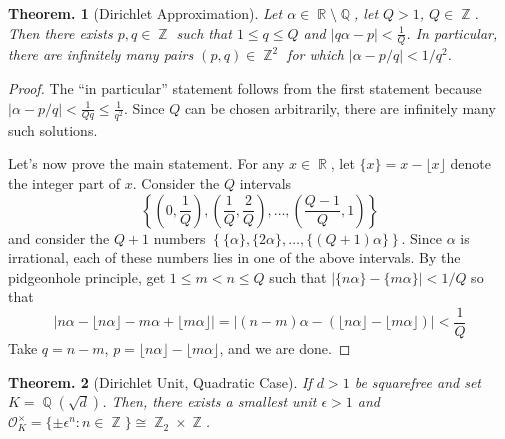 \documentclass[11pt, a4paper]{memoir}
\DeclareMathOperator{\Q}{{\mathbb{Q}}}
\DeclareMathOperator{\Z}{{\mathbb{Z}}}
\DeclareMathOperator{\R}{{\mathbb{R}}}
\theoremstyle{change}
\newtheorem{theorem}{Theorem.}[section]
\theoremstyle{plain}
\theoremstyle{nonumberplain}
\newtheorem{proof}{Proof}
\numberwithin{equation}{section}
\begin{document}
\begin{theorem}[Dirichlet Approximation]
    Let $\alpha\in\R\setminus\Q$, let $Q>1$, $Q\in\Z$.
    Then there exists $p,q\in\Z$ such that $1\leq q\leq Q$ and $|q\alpha-p|<\frac{1}{Q}$.
    In particular, there are infinitely many pairs $(p,q)\in\Z^2$ for which $|\alpha-p/q|<1/q^2$.
\end{theorem}
\begin{proof}
    The ``in particular'' statement follows from the first statement because $|\alpha-p/q|<\frac{1}{Qq}\leq\frac{1}{q^2}$.
    Since $Q$ can be chosen arbitrarily, there are infinitely many such solutions.

    Let's now prove the main statement.
    For any $x\in\R$, let $\{x\}=x-\lfloor x\rfloor$ denote the integer part of $x$.
    Consider the $Q$ intervals
    \begin{equation*}
        \left\{\left(0,\frac{1}{Q}\right),\left(\frac{1}{Q},\frac{2}{Q}\right),\ldots,\left(\frac{Q-1}{Q},1\right)\right\}
    \end{equation*}
    and consider the $Q+1$ numbers $\left\{\{\alpha\},\{2\alpha\},\ldots,\{(Q+1)\alpha\}\right\}$.
    Since $\alpha$ is irrational, each of these numbers lies in one of the above intervals.
    By the pidgeonhole principle, get $1\leq m<n\leq Q$ such that $|\{n\alpha\}-\{m\alpha\}|<1/Q$ so that
    \begin{equation*}
        \left\lvert n\alpha-\lfloor n\alpha\rfloor-m\alpha+\lfloor m\alpha\rfloor\right\rvert=\left\lvert(n-m)\alpha-(\lfloor n\alpha\rfloor-\lfloor m\alpha\rfloor)\right\rvert<\frac{1}{Q}
    \end{equation*}
    Take $q=n-m$, $p=\lfloor n\alpha\rfloor-\lfloor m\alpha\rfloor$, and we are done.
\end{proof}
\begin{theorem}[Dirichlet Unit, Quadratic Case]\label{thm:dir-unit-q}
    If $d>1$ be squarefree and set $K=\Q(\sqrt{d})$.
    Then, there exists a smallest unit $\epsilon>1$ and $\mathcal{O}_K^\times=\{\pm\epsilon^n:n\in\Z\}\cong \Z_2\times\Z$.
\end{theorem}
\end{document}
